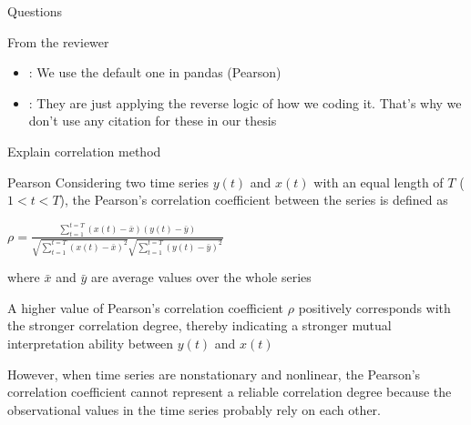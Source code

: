 \documentclass[compress, mathserif, fleqn, 10pt]{beamer}
\begin{document}
	\begin{frame}{Questions}
			\begin{block}{From the reviewer}
			\begin{itemize}
				\item {}: We use the default one in pandas (Pearson)
				
				\item {}: They are just applying the reverse logic of how we coding it. That's why we don't use any citation for these in our thesis
			\end{itemize}
		\end{block}
	\end{frame}
	
	\begin{frame}{Explain correlation method}
		\begin{block}{Pearson}
			Considering two time series $y(t)$ and $x(t)$ with an equal length of $T$ ($1 < t < T$), the Pearson's correlation coefficient between the series is defined as
			
			\bigskip
			
			\centerline{$\rho=\frac{\sum_{t=1}^{t=T}(x(t)-\bar{x})(y(t)-\bar{y})}{\sqrt{\sum_{t=1}^{t=T}(x(t)-\bar{x})^2} \sqrt{\sum_{t=1}^{t=T}(y(t)-\bar{y})^2}}$}
			\bigskip
			where $\bar{x}$ and $\bar{y}$ are average values over the whole series
			
			\smallskip
			
			A higher value of Pearson’s correlation coefficient $\rho$ positively corresponds with the stronger correlation degree, thereby indicating a stronger mutual interpretation ability between $y(t)$ and $x(t)$ 
		\end{block}
		
		\begin{exampleblock}{}
			However, when time series are nonstationary and nonlinear, the Pearson's correlation coefficient cannot represent a reliable correlation degree because the observational values in the time series probably rely on each other.
		\end{exampleblock}
		
	\end{frame}
	
\end{document}

